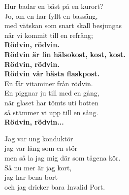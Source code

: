 \documentclass[a6paper, 10pt, twoside]{article}
\begin{document}
\noindent
\begin{center}
\end{center}
\begin{lyrics}
Hur badar en bäst på en kurort?\\
Jo, om en har fyllt en bassäng,\\
med vätskan som snart skall besjungas\\
när vi kommit till en refräng;
\vspace{5pt}\\
\textbf{Rödvin, rödvin.\\
Rödvin är fin hälsokost, kost, kost.\\
Rödvin, rödvin.\\
Rödvin vår bästa flaskpost.}
\vspace{5pt}\\
En får vitaminer från rödvin.\\
En piggnar ju till med en gång,\\
när glaset har tömts uti botten\\
så stämmer vi upp till en sång.
\vspace{5pt}\\
\textbf{Rödvin, rödvin...}
\end{lyrics}
\vspace{30pt}
\begin{center}
\end{center}
\begin{lyrics}
Jag var ung konduktör\\
jag var lång som en stör\\
men så la jag mig där som tågena kör.
\vspace{5pt}\\
Så nu mer är jag kort,\\
jag har bena bort\\
och jag dricker bara Invalid Port.
\end{lyrics}
\end{document}

